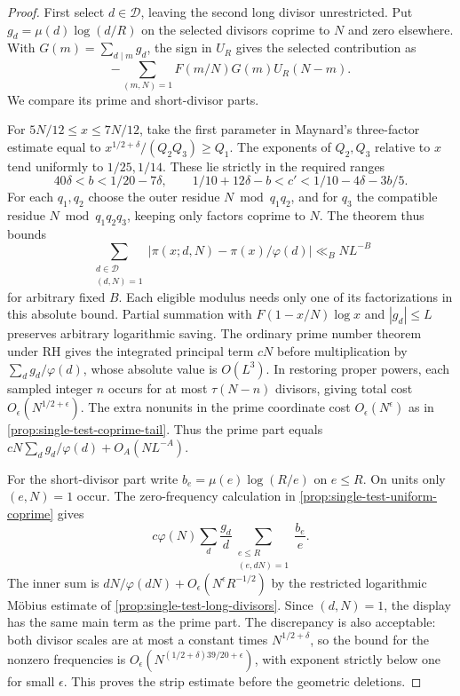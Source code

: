 \documentclass[11pt,a4paper]{article}
\numberwithin{equation}{section}
\begin{document}
\begin{proof}
First select $d\in\mathcal D$, leaving the second long divisor
unrestricted. Put $g_d=\mu(d)\log(d/R)$ on the selected divisors
coprime to $N$ and zero elsewhere. With $G(m)=\sum_{d\mid m}g_d$,
the sign in $U_R$ gives the selected contribution as
\[
 -\sum_{(m,N)=1}F(m/N)G(m)U_R(N-m).
\]
We compare its prime and short-divisor parts.

For $5N/12\le x\le7N/12$, take the first parameter in Maynard's
three-factor estimate \cite[Theorem~1.2]{MaynardIII} equal to
$x^{1/2+\delta}/(Q_2Q_3)\ge Q_1$. The exponents of $Q_2,Q_3$
relative to $x$ tend uniformly to $1/25,1/14$. These lie strictly
in the required ranges
\[
 40\delta<b<1/20-7\delta,\qquad
 1/10+12\delta-b<c'<1/10-4\delta-3b/5.
\]
For each $q_1,q_2$ choose the outer residue $N\bmod q_1q_2$,
and for $q_3$ the compatible residue $N\bmod q_1q_2q_3$,
keeping only factors coprime to $N$. The theorem thus bounds
\[
 \sum_{\substack{d\in\mathcal D\\(d,N)=1}}
       \bigl|\pi(x;d,N)-\pi(x)/\varphi(d)\bigr|
 \ll_B N L^{-B}
\]
for arbitrary fixed $B$. Each eligible modulus needs only one of
its factorizations in this absolute bound. Partial summation with
$F(1-x/N)\log x$ and $|g_d|\le L$ preserves arbitrary logarithmic
saving. The ordinary prime number theorem under RH gives the
integrated principal term $cN$ before multiplication by
$\sum_d g_d/\varphi(d)$, whose absolute value is $O(L^3)$.
In restoring proper powers, each sampled integer $n$ occurs for
at most $\tau(N-n)$ divisors, giving total cost $O_\epsilon(N^{1/2+\epsilon})$.
The extra nonunits in the prime coordinate cost $O_\epsilon(N^\epsilon)$
as in \cref{prop:single-test-coprime-tail}. Thus the prime part
equals $cN\sum_d g_d/\varphi(d)+O_A(NL^{-A})$.

For the short-divisor part write $b_e=\mu(e)\log(R/e)$ on $e\le R$.
On units only $(e,N)=1$ occur. The zero-frequency calculation in
\cref{prop:single-test-uniform-coprime} gives
\[
 c\varphi(N)\sum_d\frac{g_d}{d}
        \sum_{\substack{e\le R\\(e,dN)=1}}\frac{b_e}{e}.
\]
The inner sum is $dN/\varphi(dN)+O_\epsilon(N^\epsilon R^{-1/2})$
by the restricted logarithmic M\"obius estimate of
\cref{prop:single-test-long-divisors}. Since $(d,N)=1$, the
display has the same main term as the prime part. The discrepancy
is also acceptable: both divisor scales are at most a constant
times $N^{1/2+\delta}$, so the bound for the nonzero frequencies
is $O_\epsilon(N^{(1/2+\delta)39/20+\epsilon})$, with exponent
strictly below one for small $\epsilon$. This proves the strip
estimate before the geometric deletions.


\end{proof}
\end{document}
